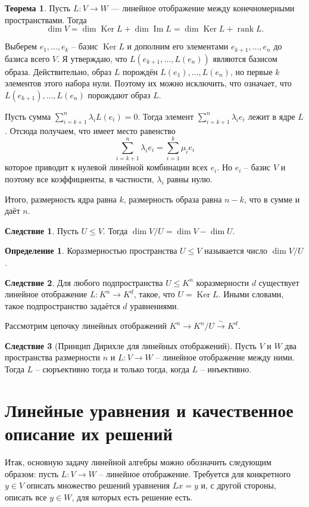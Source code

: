 \documentclass[10pt,a4paper,oneside]{book}
\theoremstyle{definition}
\newtheorem*{defn}{Определение}
\newtheorem{thm}{Теорема}
\newtheorem{cor}{Следствие}
\newcommand{\rank}{\operatorname{rank}}
\DeclareMathOperator{\Ker}{Ker}
\newcommand{\im}{\operatorname{Im}}
\def\dfn{\begin{defn}}
\def\edfn{\end{defn}}
\def\crl{\begin{cor}}
\def\ecrl{\end{cor}}
\begin{document}
\begin{thm}
Пусть $L\colon V \to W$ --- линейное отображение между конечномерными пространствами. Тогда
$$\dim V= \dim \Ker L +  \dim \im L= \dim \Ker L +\rank L.$$
\end{thm}
\proof Выберем $e_1,\dots, e_k$ -- базис $\Ker L$ и дополним его элементами $e_{k+1},\dots,e_n$ до базиса всего $V$. Я утверждаю, что $L(e_{k+1},\dots,L(e_n))$ являются базисом образа. Действительно, образ $L$ порождён $L(e_1),\dots, L(e_n)$, но первые $k$ элементов этого набора нули. Поэтому их можно исключить, что означает, что $L(e_{k+1}), \dots, L(e_n)$ порождают образ $L$.

Пусть сумма $\sum_{i=k+1}^n \lambda_i L(e_i)=0$. Тогда элемент $\sum_{i=k+1}^n \lambda_i e_i $ лежит в ядре $L$. Отсюда получаем, что имеет место равенство $$\sum_{i=k+1}^n \lambda_ie_i = \sum_{i=1}^k \mu_i e_i$$
которое приводит к нулевой линейной комбинации всех $e_i$. Но $e_i$ -- базис $V$ и поэтому все коэффициенты, в частности, $\lambda_i$ равны нулю.

Итого, размерность ядра равна $k$, размерность образа равна $n-k$, что в сумме и даёт $n$.
\endproof

\crl Пусть $U \leq V$. Тогда $\dim V/U= \dim V - \dim U$.
\ecrl

\dfn Коразмерностью пространства $U \leq V$ называется число $\dim V/U$.
\edfn

\crl Для любого подпространства $U \leq K^n$ коразмерности $d$ существует линейное отображение $L\colon K^n \to K^d$, такое, что $U=\Ker L$. Иными словами, такое подпространство задаётся $d$ уравнениями.
\ecrl
\proof Рассмотрим цепочку линейных отображений $K^n \to K^n/U \stackrel{\sim}{\longrightarrow} K^d$.
\endproof

\crl[Принцип Дирихле для линейных отображений] Пусть $V$ и $W$ два пространства размерности $n$ и $L \colon V \to W$ -- линейное отображение между ними. Тогда $L$ -- сюръективно тогда и только тогда, когда $L$ -- инъективно.
\ecrl




\section{Линейные уравнения и качественное описание их решений}
Итак, основную задачу линейной алгебры можно обозначить следующим образом: пусть $L\colon V \to W$ -- линейное отображение. Требуется для конкретного $y\in V$ описать множество решений уравнения $Lx=y$ и, с другой стороны, описать все $y\in W$, для которых есть решение есть.
\end{document}
